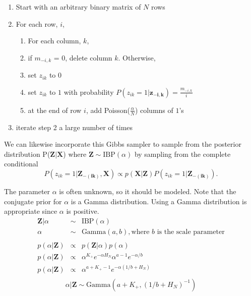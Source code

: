 \documentclass[mathserif]{article}
\def\ds{\displaystyle}
\begin{document}
\begin{enumerate}
  \item Start with an arbitrary binary matrix of $N$ rows
  \item For each row, $i$,
  \begin{enumerate}
    \item For each column, $k$,
    \item if $m_{-i,k}$ = $0$, delete column $k$. Otherwise,
    \item set $z_{ik}$ to $0$
    \item set $z_{ik}$ to $1$ with probability $P(z_{ik}=1|\bm{z_{-i,k}}) = \frac{m_{-i,k}}{i}$
    \item at the end of row $i$, add Poisson($\ds\frac{\alpha}{N}$) columns of $1$'s
  \end{enumerate}
  \item iterate step 2 a large number of times
\end{enumerate}
We can likewise incorporate this Gibbs sampler to sample from the posterior
distribution P($\bm{Z|X}$) where $\bm Z \sim \text{IBP}(\alpha)$ by
sampling from the complete conditional
\begin{equation}
  P(z_{ik}=1|\bm{Z_{-(ik)},X})  \propto p(\bm{X|Z}) P(z_{ik}=1|\bm{Z_{-(ik)}}).
\end{equation}

\noindent
The parameter $\alpha$ is often unknown, so it should be modeled. Note that the
conjugate prior for $\alpha$ is a Gamma distribution. Using a Gamma
distribution is appropriate since $\alpha$ is positive.
\[
  \begin{array}{rcl}
    \bm Z|\alpha & \sim & \text{IBP}(\alpha)\\
          \alpha & \sim & \text{Gamma}(a,b), \text{where $b$ is the scale parameter}\\
    & & \\
    p(\alpha|\bm Z) & \propto & p(\bm Z|\alpha) p(\alpha)\\
    p(\alpha|\bm Z) & \propto & \alpha^{K_+} e^{-\alpha H_N}  
                                \alpha^{a-1} e^{-\alpha/b}\\
    p(\alpha|\bm Z) & \propto & \alpha^{a+K_+-1} e^{-\alpha(1/b+H_N)}\\
  \end{array}
\]
\begin{equation}
  \alpha|\bm Z  \sim  \text{Gamma}(a+K_+, (1/b+H_N)^{-1})
\end{equation}
\end{document}
